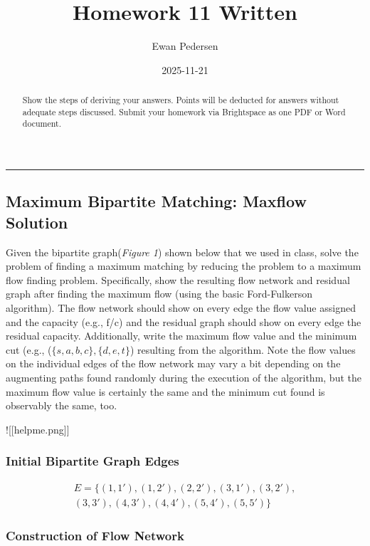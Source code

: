 \documentclass[
]{article}
\title{Homework 11 Written}
\author{Ewan Pedersen}
\date{2025-11-21}
\begin{document}
\maketitle
\begin{abstract}
Show the steps of deriving your answers. Points will be deducted for
answers without adequate steps discussed. Submit your homework via
Brightspace as one PDF or Word document.
\end{abstract}

\begin{center}\rule{0.5\linewidth}{0.5pt}\end{center}

\subsection{Maximum Bipartite Matching: Maxflow
Solution}\label{maximum-bipartite-matching-maxflow-solution}

Given the bipartite graph(\emph{Figure 1}) shown below that we used in
class, solve the problem of finding a maximum matching by reducing the
problem to a maximum flow finding problem. Specifically, show the
resulting flow network and residual graph after finding the maximum flow
(using the basic Ford-Fulkerson algorithm). The flow network should show
on every edge the flow value assigned and the capacity (e.g., f/c) and
the residual graph should show on every edge the residual capacity.
Additionally, write the maximum flow value and the minimum cut (e.g.,
(\(\{ s,a,b,c \}, \{ d,e,t \}\)) resulting from the algorithm. Note the
flow values on the individual edges of the flow network may vary a bit
depending on the augmenting paths found randomly during the execution of
the algorithm, but the maximum flow value is certainly the same and the
minimum cut found is observably the same, too.

!{[}{[}helpme.png{]}{]}

\subsubsection{Initial Bipartite Graph
Edges}\label{initial-bipartite-graph-edges}

\[
\begin{align}
E = \{(1, 1'), (1, 2'), (2, 2'), (3, 1'), (3, 2'), \\
(3, 3'), (4, 3'), (4, 4'), (5, 4'), (5, 5') \} 
\end{align}
\]

\subsubsection{Construction of Flow
Network}\label{construction-of-flow-network}
\end{document}
